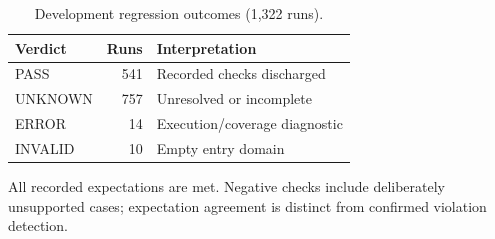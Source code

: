 \begin{table}[t]
\centering\small
\caption{Development regression outcomes (1,322 runs).}
\label{tab:regression}
\begin{tabular}{lrl}
\toprule
Verdict & Runs & Interpretation \\
\midrule
PASS & 541 & Recorded checks discharged \\
UNKNOWN & 757 & Unresolved or incomplete \\
ERROR & 14 & Execution/coverage diagnostic \\
INVALID & 10 & Empty entry domain \\
\bottomrule
\end{tabular}
\par\smallskip\parbox{\columnwidth}{\footnotesize All recorded expectations are met. Negative checks include deliberately unsupported cases; expectation agreement is distinct from confirmed violation detection.}
\end{table}
